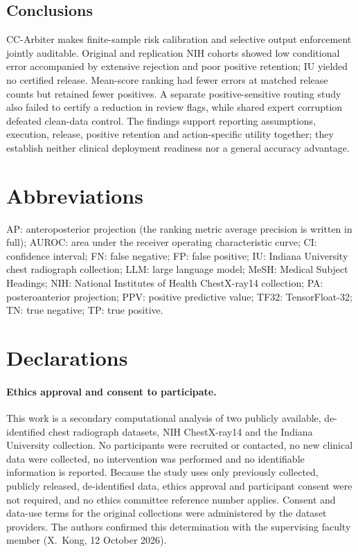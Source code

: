 \documentclass[10pt,a4paper]{article}
\begin{document}
\begin{samepage}
\section{Conclusions}
CC-Arbiter makes finite-sample risk calibration and selective output enforcement jointly auditable. Original and replication NIH cohorts showed low conditional error accompanied by extensive rejection and poor positive retention; IU yielded no certified release. Mean-score ranking had fewer errors at matched release counts but retained fewer positives. A separate positive-sensitive routing study also failed to certify a reduction in review flags, while shared expert corruption defeated clean-data control. The findings support reporting assumptions, execution, release, positive retention and action-specific utility together; they establish neither clinical deployment readiness nor a general accuracy advantage.
\end{samepage}

\section*{Abbreviations}
AP: anteroposterior projection (the ranking metric average precision is written in full); AUROC: area under the receiver operating characteristic curve; CI: confidence interval; FN: false negative; FP: false positive; IU: Indiana University chest radiograph collection; LLM: large language model; MeSH: Medical Subject Headings; NIH: National Institutes of Health ChestX-ray14 collection; PA: posteroanterior projection; PPV: positive predictive value; TF32: TensorFloat-32; TN: true negative; TP: true positive.

\section*{Declarations}
\paragraph{Ethics approval and consent to participate.} This work is a secondary computational analysis of two publicly available, de-identified chest radiograph datasets, NIH ChestX-ray14 and the Indiana University collection. No participants were recruited or contacted, no new clinical data were collected, no intervention was performed and no identifiable information is reported. Because the study uses only previously collected, publicly released, de-identified data, ethics approval and participant consent were not required, and no ethics committee reference number applies. Consent and data-use terms for the original collections were administered by the dataset providers. The authors confirmed this determination with the supervising faculty member (X.~Kong, 12 October 2026).
\end{document}
